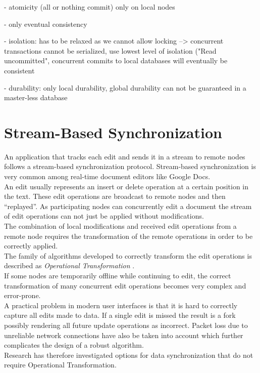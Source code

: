 - atomicity (all or nothing commit) only on local nodes

- only eventual consistency

- isolation: has to be relaxed as we cannot allow locking --> concurrent transactions cannot be serialized, use lowest level of isolation ("Read uncommitted", concurrent commits to local databases will eventually be consistent

- durability: only local durability, global durability can not be guaranteed in a master-less database

\section{Stream-Based Synchronization}
\label{sec:background.stream-based}
An application that tracks each edit and sends it in a stream to remote nodes follows a stream-based synchronization protocol.
Stream-based synchronization is very common among real-time document editors like Google Docs.\\

An edit usually represents an insert or delete operation at a certain position in the text.
These edit operations are broadcast to remote nodes and then ``replayed''.
As participating nodes can concurrently edit a document the stream of edit operations can not just be applied without modifications.\\
The combination of local modifications and received edit operations from a remote node requires the transformation of the remote operations in order to be correctly applied.\\
The family of algorithms developed to correctly transform the edit operations is described as \emph{Operational Transformation} \cite{Ellis:1998vf}.\\
If some nodes are temporarily offline while continuing to edit, the correct transformation of many concurrent edit operations becomes very complex and error-prone.\\
A practical problem in modern user interfaces is that it is hard to correctly capture all edits made to data.
If a single edit is missed the result is a fork possibly rendering all future update operations as incorrect.
Packet loss due to unreliable network connections have also be taken into account which further complicates the design of a robust algorithm.\\
Research has therefore investigated options for data synchronization that do not require Operational Transformation.\\

